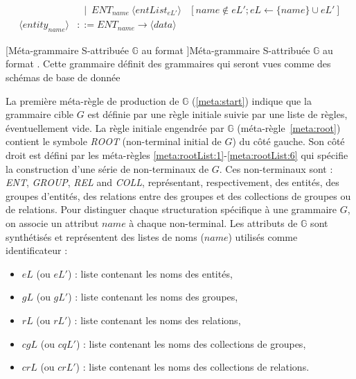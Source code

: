 \begin{landscape}
\begin{adjustbox}{max width=\linewidth,max height=.95\textheight,valign=c}
{\begin{align}
                                                            & ~~ \mid ~ ENT_{name} ~ \langle entList_{eL'} \rangle                                                                                                                                                                                                                                                                                                                                         & [name \notin eL'; eL \gets \{name\} \cup eL']                                                                     \label{meta:entList:2}  \\
                \langle entity_{name} \rangle               & ::= ENT_{name} \to \langle data \rangle \label{meta:entity}
            \end{align}}
    \end{adjustbox}
    [Méta-grammaire S-attribuée $\mathbb{G}$ au format ]{Méta-grammaire S-attribuée $\mathbb{G}$ au format . Cette grammaire définit des grammaires qui seront vues comme des schémas de base de donnée \label{table:struct:meta}}
\end{landscape}

La première méta-règle de production de $\mathbb{G}$ (\ref{meta:start}) indique que la grammaire cible $G$ est définie par une règle initiale suivie par une liste de règles, éventuellement vide.
La règle initiale engendrée par $\mathbb{G}$ (méta-règle~\ref{meta:root}) contient le symbole \emph{ROOT} (non-terminal initial de $G$) du côté gauche.
Son côté droit est défini par les méta-règles \ref{meta:rootList:1}-\ref{meta:rootList:6} qui spécifie la construction d'une série de non-terminaux de $G$.
Ces non-terminaux sont : \emph{ENT}, \emph{GROUP}, \emph{REL} and \emph{COLL}, représentant, respectivement, des entités, des groupes d'entités, des relations entre des groupes et des collections de groupes ou de relations.
Pour distinguer chaque structuration spécifique à une grammaire $G$, on associe un attribut $name$ à chaque non-terminal.
Les attributs de $\mathbb{G}$ sont synthétisés et représentent des listes de noms ($name$) utilisés comme identificateur :
\begin{itemize}
    \item $eL$ (ou $eL'$) : liste contenant les noms des entités,
    \item $gL$ (ou $gL'$) : liste contenant les noms des groupes,
    \item $rL$ (ou $rL'$) : liste contenant les noms des relations,
    \item $cgL$ (ou $cqL'$) : liste contenant les noms des collections de groupes,
    \item $crL$ (ou $crL'$) : liste contenant les noms des collections de relations.
\end{itemize}

